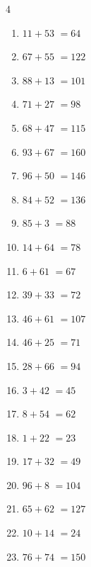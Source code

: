 \begin{multicols}{4}
\begin{enumerate}
  \item $11+53$
        $=64$

  \item $67+55$
        $=122$

  \item $88+13$
        $=101$

  \item $71+27$
        $=98$

\columnbreak %

\resetques

  \item $68+47$
        $=115$

  \item $93+67$
        $=160$

  \item $96+50$
        $=146$

  \item $84+52$
        $=136$

  \item $85+3$
        $=88$

  \item $14+64$
        $=78$

  \item $6+61$
        $=67$

  \item $39+33$
        $=72$

  \item $46+61$
        $=107$

  \item $46+25$
        $=71$

  \item $28+66$
        $=94$

  \item $3+42$
        $=45$

  \item $8+54$
        $=62$

  \item $1+22$
        $=23$

  \item $17+32$
        $=49$

  \item $96+8$
        $=104$

  \item $65+62$
        $=127$

  \item $10+14$
        $=24$

  \item $76+74$
        $=150$


\end{enumerate}
\end{multicols}

